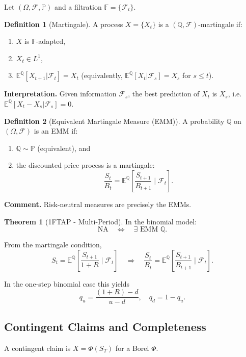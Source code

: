\documentclass[12pt,a4paper]{article}
\theoremstyle{definition}
\newtheorem{definition}{Definition}[section]
\newtheorem{theorem}{Theorem}[section]
\newcommand{\Q}{\mathbb{Q}}
\newcommand{\E}{\mathbb{E}}
\newcommand{\Prob}{\mathbb{P}}
\begin{document}
Let $(\Omega, \mathcal{F}, \Prob)$ and a filtration $\mathbb{F} = \{\mathcal{F}_t\}$.

\begin{definition}[Martingale]
A process $X = \{X_t\}$ is a $(\Q, \mathcal{F})$-martingale if:
\begin{enumerate}
\item $X$ is $\mathbb{F}$-adapted,
\item $X_t \in L^1$,
\item $\E^\Q[X_{t+1}|\mathcal{F}_t] = X_t$ (equivalently, $\E^\Q[X_t|\mathcal{F}_s] = X_s$ for $s \leq t$).
\end{enumerate}
\end{definition}

\textbf{Interpretation.} Given information $\mathcal{F}_s$, the best prediction of $X_t$ is $X_s$, i.e. $\E^\Q[X_t - X_s|\mathcal{F}_s] = 0$.

\begin{definition}[Equivalent Martingale Measure (EMM)]
A probability $\Q$ on $(\Omega, \mathcal{F})$ is an EMM if:
\begin{enumerate}[label=(\roman*)]
\item $\Q \sim \Prob$ (equivalent), and
\item the discounted price process is a martingale:
\[
\frac{S_t}{B_t} = \E^\Q\left[\frac{S_{t+1}}{B_{t+1}} \mid \mathcal{F}_t\right].
\]
\end{enumerate}
\end{definition}

\textbf{Comment.} Risk-neutral measures are precisely the EMMs.

\begin{theorem}[1FTAP - Multi-Period]
In the binomial model:
\[
\text{NA} \quad \Leftrightarrow \quad \exists \text{ EMM } \Q.
\]
\end{theorem}

From the martingale condition,
\[
S_t = \E^\Q\left[\frac{S_{t+1}}{1+R} \mid \mathcal{F}_t\right] \quad \Rightarrow \quad \frac{S_t}{B_t} = \E^\Q\left[\frac{S_{t+1}}{B_{t+1}} \mid \mathcal{F}_t\right].
\]

In the one-step binomial case this yields
\[
q_u = \frac{(1+R) - d}{u - d}, \quad q_d = 1 - q_u.
\]

\subsection{Contingent Claims and Completeness}

A contingent claim is $X = \Phi(S_T)$ for a Borel $\Phi$.
\end{document}
